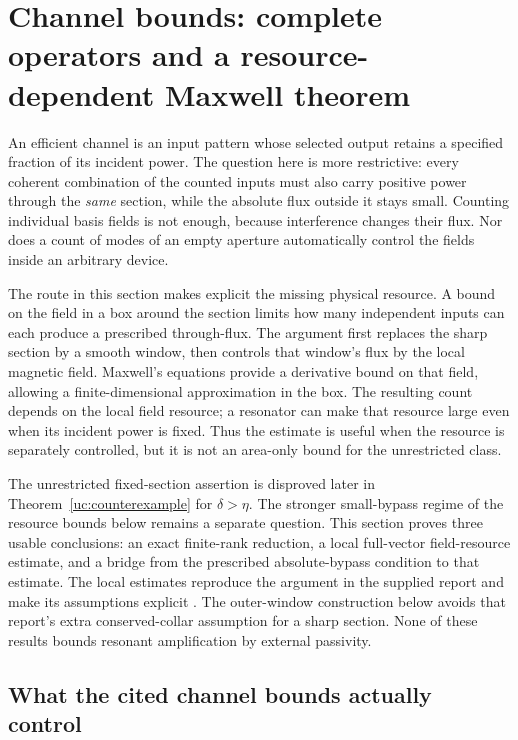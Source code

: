 \section[Channel bounds with an explicit field resource]{Channel bounds: complete operators and a resource-dependent Maxwell theorem}
\label{ch:section}

An efficient channel is an input pattern whose selected output retains a
specified fraction of its incident power.  The question here is more
restrictive: every coherent combination of the counted inputs must also
carry positive power through the \emph{same} section, while the absolute
flux outside it stays small.  Counting individual basis fields is not enough,
because interference changes their flux.  Nor does a count of modes of an
empty aperture automatically control the fields inside an arbitrary device.

The route in this section makes explicit the missing physical resource.  A
bound on the field in a box around the section limits how many independent
inputs can each produce a prescribed through-flux.  The argument first
replaces the sharp section by a smooth window, then controls that window's
flux by the local magnetic field.  Maxwell's equations provide a derivative
bound on that field, allowing a finite-dimensional approximation in the box.
The resulting count depends on the local field resource; a resonator can make
that resource large even when its incident power is fixed.  Thus the estimate
is useful when the resource is separately controlled, but it is not an
area-only bound for the unrestricted class.

The unrestricted fixed-section assertion is disproved later in
Theorem~\ref{uc:counterexample} for $\delta>\eta$. The stronger small-bypass
regime of the resource bounds below remains a separate question.
This section proves three usable conclusions: an exact finite-rank reduction,
a local full-vector field-resource estimate, and a bridge from the prescribed
absolute-bypass condition to that estimate.  The local estimates reproduce
the argument in the supplied report and make its assumptions explicit
\cite[Section 3]{priorreport}.  The outer-window construction below avoids that
report's extra conserved-collar assumption for a sharp section.  None of these
results bounds resonant amplification by external passivity.

\subsection{What the cited channel bounds actually control}
\label{ch:literature}

